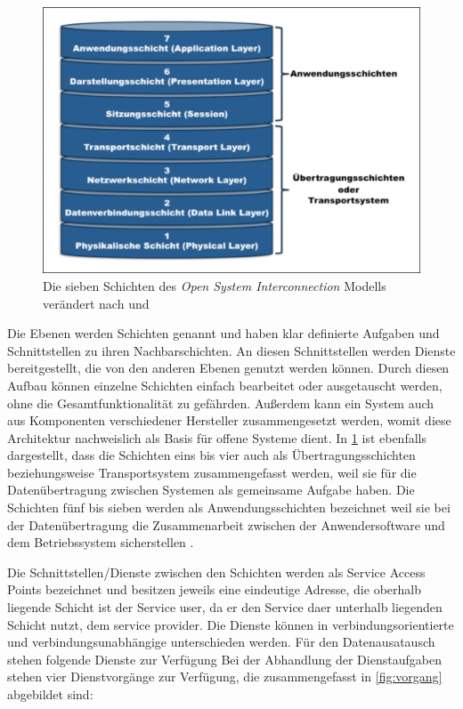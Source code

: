 \begin{figure}
\centering
\includegraphics[width=\textwidth]{abbildungen/20160112_osi}
\caption[Die sieben Schichten des Open System Interconnection Modells]{Die sieben Schichten des \textit{Open System Interconnection} Modells verändert nach \cite[S.~10]{schn06} und \cite[S.~28]{osi96}}
\label{fig:osi}
\end{figure}

Die Ebenen werden Schichten genannt und haben klar definierte Aufgaben und Schnittstellen zu ihren Nachbarschichten. An diesen Schnittstellen werden Dienste bereitgestellt, die von den anderen Ebenen genutzt werden können. Durch diesen Aufbau können einzelne Schichten einfach bearbeitet oder ausgetauscht werden, ohne die Gesamtfunktionalität zu gefährden. Außerdem kann ein System auch aus Komponenten verschiedener Hersteller zusammengesetzt werden, womit diese Architektur nachweislich als Basis für offene Systeme dient. In \ref{fig:osi} ist ebenfalls dargestellt, dass die Schichten eins bis vier auch als Übertragungsschichten beziehungsweise Transportsystem zusammengefasst werden, weil sie für die Datenübertragung zwischen Systemen als gemeinsame Aufgabe haben. Die Schichten fünf bis sieben werden als Anwendungsschichten bezeichnet weil sie bei der Datenübertragung die Zusammenarbeit zwischen der Anwendersoftware und dem Betriebssystem sicherstellen \cite[S.~8f.]{schn06}.

Die Schnittstellen/Dienste zwischen den Schichten werden als Service Access Points bezeichnet und besitzen jeweils eine eindeutige Adresse, die oberhalb liegende Schicht ist der Service user, da er den Service daer unterhalb liegenden Schicht nutzt, dem service provider. Die Dienste können in verbindungsorientierte und verbindungsunabhängige unterschieden werden.
Für den Datenausatausch stehen folgende Dienste zur Verfügung
Bei der Abhandlung der Dienstaufgaben stehen vier Dienstvorgänge zur Verfügung, die zusammengefasst in \ref{fig:vorgang} abgebildet sind:

